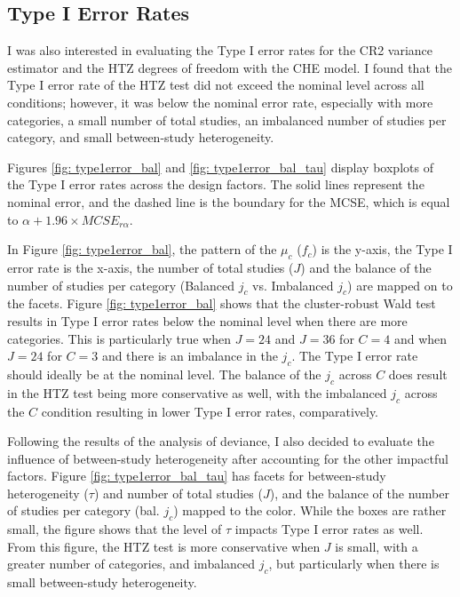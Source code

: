 \subsection{Type I Error Rates}

I was also interested in evaluating the Type I error rates for the CR2 variance estimator and the HTZ degrees of freedom with the CHE model. I found that the Type I error rate of the HTZ test did not exceed the nominal level across all conditions; however, it was below the nominal error rate, especially with more categories, a small number of total studies, an imbalanced number of studies per category, and small between-study heterogeneity. 


Figures \ref{fig: type1error_bal} and \ref{fig: type1error_bal_tau} display boxplots of the Type I error rates across the design factors. The solid lines represent the nominal error, and the dashed line is the boundary for the MCSE, which is equal to $\alpha + 1.96 \times MCSE_{r\alpha}$. 

In Figure \ref{fig: type1error_bal}, the pattern of the $\mu_c$ ($f_c$) is the y-axis, the Type I error rate is the x-axis, the number of total studies ($J$) and the balance of the number of studies per category (Balanced $j_c$ vs. Imbalanced $j_c$) are mapped on to the facets. Figure \ref{fig: type1error_bal} shows that the cluster-robust Wald test results in Type I error rates below the nominal level when there are more categories. This is particularly true when $J = 24$ and $J = 36$ for $C = 4$ and when $J = 24$ for $C = 3$ and there is an imbalance in the $j_c$.  The Type I error rate should ideally be at the nominal level. The balance of the $j_c$ across $C$ does result in the HTZ test being more conservative as well, with the imbalanced $j_c$ across the $C$ condition resulting in lower Type I error rates, comparatively. 

Following the results of the analysis of deviance, I also decided to evaluate the influence of between-study heterogeneity after accounting for the other impactful factors. Figure \ref{fig: type1error_bal_tau} has facets for between-study heterogeneity ($\tau$) and number of total studies ($J$), and the balance of the number of studies per category (bal. $j_c$) mapped to the color. While the boxes are rather small, the figure shows that the level of $\tau$ impacts Type I error rates as well. From this figure, the HTZ test is more conservative when $J$ is small, with a greater number of categories, and imbalanced $j_c$, but particularly when there is small between-study heterogeneity.

